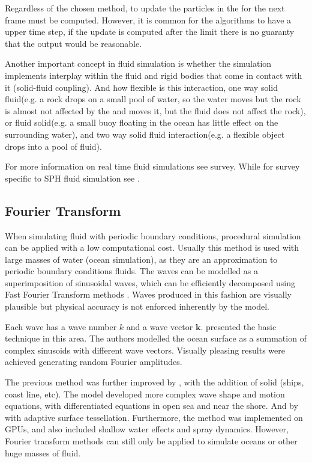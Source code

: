Regardless of the chosen method, to update the particles in the for the next frame must be computed.
However, it is common for the algorithms to have a upper time step, if the update is computed after the limit there is no guaranty that the output would be reasonable.

Another important concept in fluid simulation is whether the simulation implements interplay within the fluid and rigid bodies that come in contact with it (solid-fluid coupling).
And how flexible is this interaction, one way solid fluid(e.g. a rock drops on a small pool of water, so the water moves but the rock is almost not affected by the  and moves it, but the fluid does not affect the rock), or fluid solid(e.g. a small buoy floating in the ocean has little effect on the surrounding water), and two way solid fluid interaction(e.g. a flexible object drops into a pool of fluid).

For more information on real time fluid simulations see \cite{Vines2012} survey.
While for survey specific to SPH fluid simulation see \cite{Ihmsen2014}.

\subsection{Fourier Transform}

When simulating fluid with periodic boundary conditions, procedural simulation can be applied with a low computational cost.
Usually this method is used with large masses of water (ocean simulation), as they are an approximation to periodic boundary conditions fluids.
The waves can be modelled as a superimposition of sinusoidal waves, which can be efficiently decomposed using Fast Fourier Transform methods \cite{Mastin1987}.
Waves produced in this fashion are visually plausible but physical accuracy is not enforced inherently by the model.

Each wave has a wave number $k$ and a wave vector $\mathbf{k}$.
\cite{Tessendorf2001} presented the basic technique in this area.
The authors modelled the ocean surface as a summation of complex sinusoids with different wave vectors.
Visually pleasing results were achieved generating random Fourier amplitudes.

The previous method was further improved by \cite{Cieutat2003}, with the addition of solid (ships, coast line, etc).
The model developed more complex wave shape and motion equations, with differentiated equations in open sea and near the shore.
And by \cite{Chiu2006} with adaptive surface tessellation.
Furthermore, the method was implemented on GPUs, and also included shallow water effects and spray dynamics.
However, Fourier transform methods can still only be applied to simulate oceans or other huge masses of fluid. 

